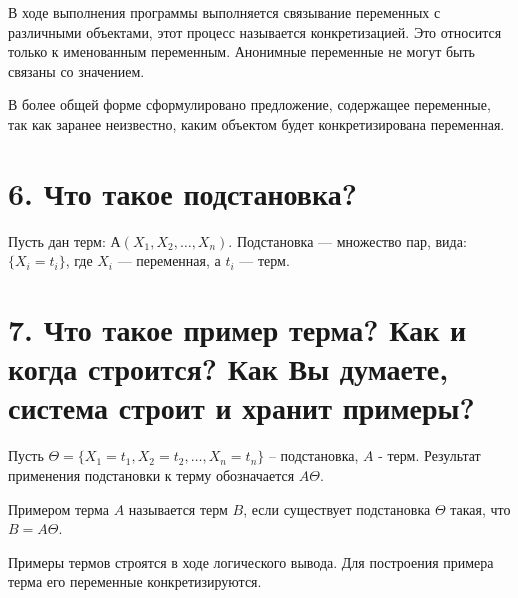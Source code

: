 В ходе выполнения программы выполняется связывание переменных с различными объектами, этот процесс называется конкретизацией. Это относится только к именованным переменным. Анонимные переменные не могут быть связаны со значением.

В более общей форме сформулировано предложение, содержащее переменные, так как заранее неизвестно, каким объектом будет конкретизирована переменная.

\section*{6. Что такое подстановка?}

Пусть дан терм: $А(X_1, X_2, \ldots , X_n)$.
Подстановка --- множество пар, вида: \\ $\{X _ i = t _ i\}$, где $X_i$ --- переменная, а $t_i$ --- терм.

\section*{7. Что такое пример терма? Как и когда строится? Как Вы думаете, система строит и хранит примеры?}

Пусть $\Theta =  \{X_1 = t_1, X_2= t_2, \dots , X_n = t_n \}$   –   подстановка, $A$ - терм. Результат применения подстановки к терму обозначается $A\Theta$.

Примером терма $A$ называется терм $B$, если существует подстановка $\Theta$ такая, что $B = A\Theta$.

Примеры термов строятся в ходе логического вывода. Для построения примера терма его переменные конкретизируются.